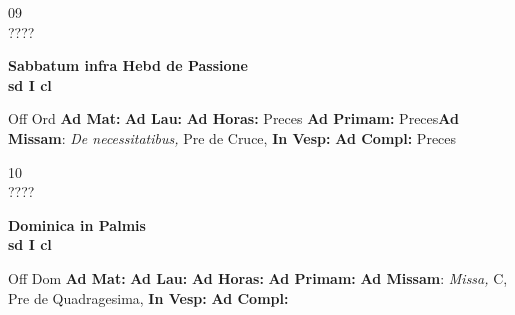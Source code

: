 \documentclass[10pt, openany]{book}
\begin{document}
    \begin{center}
        \begin{minipage}{3.5in}
            \vspace{2em}
            \begin{minipage}{0.5in}
                {\Huge 09} \\
                {\normalsize ????}
            \end{minipage}
            \begin{minipage}{3.0in}
                \textbf{ \large Sabbatum infra Hebd de Passione \\
                \textnormal{\normalsize sd I cl}}

            \end{minipage}
            \begin{justify}Off Ord
                \textbf{Ad Mat: }
                \textbf{Ad Lau: }
                \textbf{Ad Horas: }Preces
                \textbf{Ad Primam: }Preces\textbf{Ad Missam}: \textit{De necessitatibus,} Pre de Cruce, 
                \textbf{In Vesp: }
                \textbf{Ad Compl: }Preces
            \end{justify}
        \end{minipage}
    \end{center}

    \begin{center}
        \begin{minipage}{3.5in}
            \vspace{2em}
            \begin{minipage}{0.5in}
                {\Huge 10} \\
                {\normalsize ????}
            \end{minipage}
            \begin{minipage}{3.0in}
                \textbf{ \large Dominica in Palmis \\
                \textnormal{\normalsize sd I cl}}

            \end{minipage}
            \begin{justify}Off Dom
                \textbf{Ad Mat: }
                \textbf{Ad Lau: }
                \textbf{Ad Horas: }
                \textbf{Ad Primam: }\textbf{Ad Missam}: \textit{Missa,} C, Pre de Quadragesima, 
                \textbf{In Vesp: }
                \textbf{Ad Compl: }
            \end{justify}
        \end{minipage}
    \end{center}
\end{document}
